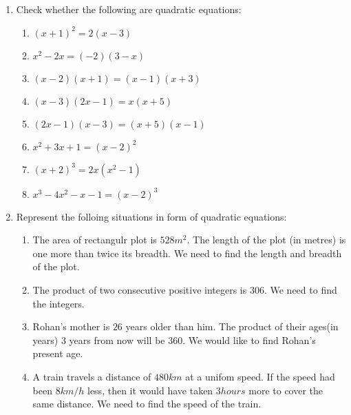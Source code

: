 \begin{enumerate}
\item Check whether the following are quadratic equations:
\begin{enumerate}[label=(\roman*)]
\item $(x+1)^2=2(x-3)$
\item $x^2-2x=(-2)(3-x)$
\item $(x-2)(x+1)=(x-1)(x+3)$
\item $(x-3)(2x-1)=x(x+5)$
\item $(2x-1)(x-3)=(x+5)(x-1)$
\item $x^2+3x+1=(x-2)^2$
\item $(x+2)^3=2x(x^2-1)$
\item $x^3-4x^2-x-1=(x-2)^3$
\end{enumerate}
\item Represent the folloing situations in form of quadratic equations:
\begin{enumerate}[label=(\roman*)]
\item The area of rectangulr plot is $528m^2$. The length of the plot (in metres) is one more than twice its breadth. We need to find the length and breadth of the plot.
\item The product of two consecutive positive integers is $306$. We need to find the integers.
\item Rohan's mother is $26$ years older than him. The product of their ages(in years) $3$ years from now will be $360$. We would like to find Rohan's present age.
\item A train travels a distance of $480km$ at a unifom speed. If the speed had been $8km/h$ less, then it would have taken $3 hours$ more to cover the same distance. We need to find the speed of the train.
\end{enumerate}
\end{enumerate}
